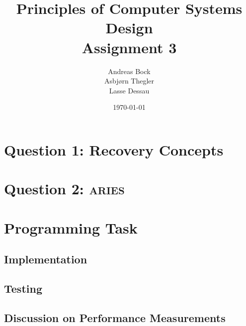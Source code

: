 \documentclass[11pt]{article}
\def\Author{Andreas Bock\\
Asbj\o rn Thegler\\
Lasse Dessau
}
\def\Title{\bf Principles of Computer Systems Design\\ {\Large Assignment 3}}
\begin{document}
\title{\Title}
\author{\Author}
\date{\today}
\maketitle

\section*{Question 1: Recovery Concepts}

\section*{Question 2: \textsc{aries}}

\section*{Programming Task}

\subsection*{Implementation}


\subsection*{Testing}

\subsection*{Discussion on Performance Measurements}
\end{document}
